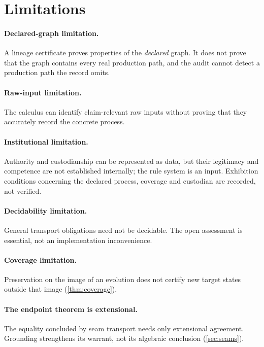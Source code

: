 \section{Limitations}\label{sec:limitations}

\paragraph{Declared-graph limitation.}
A lineage certificate proves properties of the \emph{declared} graph. It does not prove that the graph contains every real production path, and the audit cannot detect a production path the record omits.

\paragraph{Raw-input limitation.}
The calculus can identify claim-relevant raw inputs without proving that they accurately record the concrete process.

\paragraph{Institutional limitation.}
Authority and custodianship can be represented as data, but their legitimacy and competence are not established internally; the rule system is an input. Exhibition conditions concerning the declared process, coverage and custodian are recorded, not verified.

\paragraph{Decidability limitation.}
General transport obligations need not be decidable. The open assessment is essential, not an implementation inconvenience.

\paragraph{Coverage limitation.}
Preservation on the image of an evolution does not certify new target states outside that image (\cref{thm:coverage}).

\paragraph{The endpoint theorem is extensional.}
The equality concluded by seam transport needs only extensional agreement. Grounding strengthens its warrant, not its algebraic conclusion (\cref{sec:seams}).

